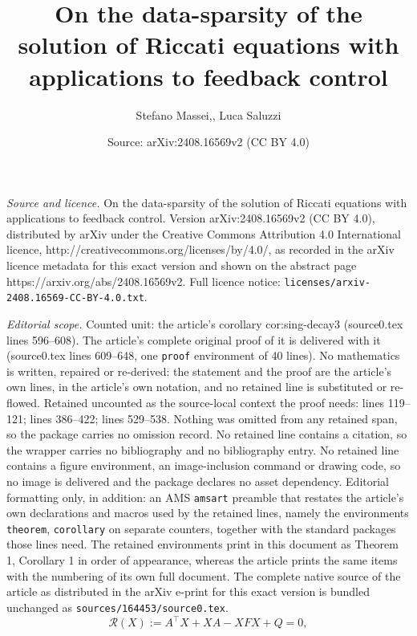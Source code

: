 \documentclass[10pt,a4paper]{amsart}
\title{On the data-sparsity of the solution of Riccati equations with applications to feedback control}
\author{Stefano Massei,, Luca Saluzzi}
\date{Source: arXiv:2408.16569v2 (CC BY 4.0)}
\begin{document}
\maketitle

\noindent\emph{Source and licence.} On the data-sparsity of the solution of Riccati equations with applications to feedback control. Version arXiv:2408.16569v2 (CC BY 4.0), distributed by arXiv under the Creative Commons Attribution 4.0 International licence, http://creativecommons.org/licenses/by/4.0/, as recorded in the arXiv licence metadata for this exact version and shown on the abstract page https://arxiv.org/abs/2408.16569v2. Full licence notice: \texttt{licenses/arxiv-2408.16569-CC-BY-4.0.txt}.\par\smallskip

\noindent\textit{Editorial scope.} Counted unit: the article's corollary cor:sing-decay3 (source0.tex lines 596--608). The article's complete original proof of it is delivered with it (source0.tex lines 609--648, one \texttt{proof} environment of 40 lines). No mathematics is written, repaired or re-derived: the statement and the proof are the article's own lines, in the article's own notation, and no retained line is substituted or re-flowed.  Retained uncounted as the source-local context the proof needs: lines 119--121; lines 386--422; lines 529--538.  Nothing was omitted from any retained span, so the package carries no omission record.  No retained line contains a citation, so the wrapper carries no bibliography and no bibliography entry.  No retained line contains a figure environment, an image-inclusion command or drawing code, so no image is delivered and the package declares no asset dependency.  Editorial formatting only, in addition: an AMS \texttt{amsart} preamble that restates the article's own declarations and macros used by the retained lines, namely the environments \texttt{theorem}, \texttt{corollary} on separate counters, together with the standard packages those lines need.  The retained environments print in this document as Theorem 1, Corollary 1 in order of appearance, whereas the article prints the same items with the numbering of its own full document.  The complete native source of the article as distributed in the arXiv e-print for this exact version is bundled unchanged as \texttt{sources/164453/source0.tex}.
\begin{equation}\label{eq:care}
\mathcal{R}(X) := A^\top X+XA- XFX+Q=0,	
\end{equation}
\end{document}
